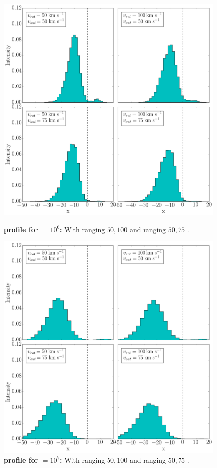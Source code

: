 \documentclass[twocolappendix]{latex/emulateapj}
\begin{document}
\begin{figure}[!htbp]
	\centering
	\begin{minipage}[b]{0.45\textwidth}
		\includegraphics[width=\textwidth]{./figures/appendix/2_tau10E6_phi83-90}
		\caption{\textbf{\lya profile for \tauh$=10^6$:} With \vrot ranging $50,100$ \kms and \vout ranging $50,75$ \kms.
			\label{fig:2_tau10E6_phi83-90}}
	\end{minipage}
	\hfill
	\begin{minipage}[b]{0.45\textwidth}
		\includegraphics[width=\textwidth]{./figures/appendix/2_tau10E7_phi83-90}
		\caption{\textbf{\lya profile for \tauh$=10^7$:} With \vrot ranging $50,100$ \kms and \vout ranging $50,75$ \kms.
			\label{fig:2_tau10E7_phi83-90}}
	\end{minipage}
\end{figure}
\end{document}
